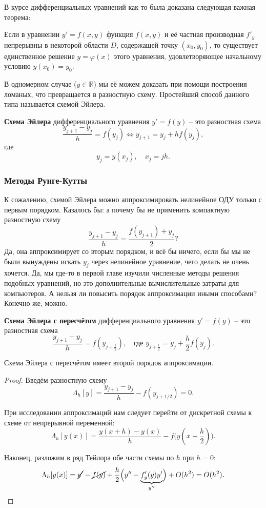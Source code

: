 \documentclass[../main.tex]{subfile}
\begin{document}
В курсе дифференциальных уравнений как-то была доказана следующая важная
теорема:

\begin{theorem}
	Если в уравнении $y'=f(x,y)$ функция $f(x,y)$ и её частная производная
	$f'_y$ непрерывны в некоторой области $D$, содержащей точку $(x_0,
	y_0)$, то существует единственное решение $y=\varphi(x)$ этого
	уравнения, удовлетворяющее начальному условию $y(x_0)=y_0$.
\end{theorem}

В одномерном случае ($y\in \mathbb R$) мы её можем доказать при помощи
построения ломаных, что превращается в разностную схему. Простейший способ
данного типа называется схемой Эйлера.

\begin{define}
	\textbf{Схема Эйлера} дифференциального уравнения $y'=f(y)$ -- это
	разностная схема
	\[\frac{y_{j+1}-y_j}{h}=f(y_j)\Leftrightarrow y_{j+1}=y_j+hf(y_j),\]
	где
	\[y_j=y(x_j),\quad x_j=jh.\]
\end{define}

\subsubsection{Методы Рунге-Кутты}
К сожалению, схемой Эйлера можно аппроксимировать нелинейное ОДУ только с первым
порядком. Казалось бы: а почему бы не применить компактную разностную схему
\[\frac{y_{j+1}-y_j}{h}=\frac{f(y_{j+1})+y_j}{2}?\]
Да, она аппроксимирует со вторым порядком, и всё бы ничего, если бы мы не были
вынуждены искать $y_j$ через нелинейное уравнение, чего делать не очень хочется.
Да, мы где-то в первой главе изучили численные методы решения подобных уравнений,
но это дополнительные вычислительные затраты для компьютеров. А нельзя ли
повысить порядок аппроксимации иными способами? Конечно же, можно.

\begin{define}
	\textbf{Схема Эйлера с пересчётом} дифференциального уравнения $y'=f(y)$
	-- это разностная схема
	\[\frac{y_{j+1}-y_j}{h}=f(y_{j+\frac{1}{2}}),\quad\text{где }
	y_{j+\frac{1}{2}}=y_j+\frac{h}{2}f(y_j).\]
\end{define}

\begin{theorem}
	Схема Эйлера с пересчётом имеет второй порядок аппроксимации.
\end{theorem}

\begin{proof}
	Введём разностную схему
	\[\Lambda_h[y]=\frac{y_{j+1}-y_j}{h}-f(y_{j+1/2})=0.\]

	При исследовании аппроксимаций нам следует перейти от дискретной схемы к
	схеме от непрерывной переменной:
	\[\Lambda_h[y(x)]=\frac{y(x+h)-y(x)}{h}-f\big(y(x+\frac{h}{2})\big).\]

	Наконец, разложим в ряд Тейлора обе части схемы по $h$ при $h=0$:
	\[\Lambda_h[y(x)]=\cancel{y'}-\cancel{f(y)}+\frac{h}{2}\Big(y''-
	\underset{y''}{\underbrace{f'_y(y)y'}}\Big)+O(h^2)=O(h^2).\]
\end{proof}
\end{document}

